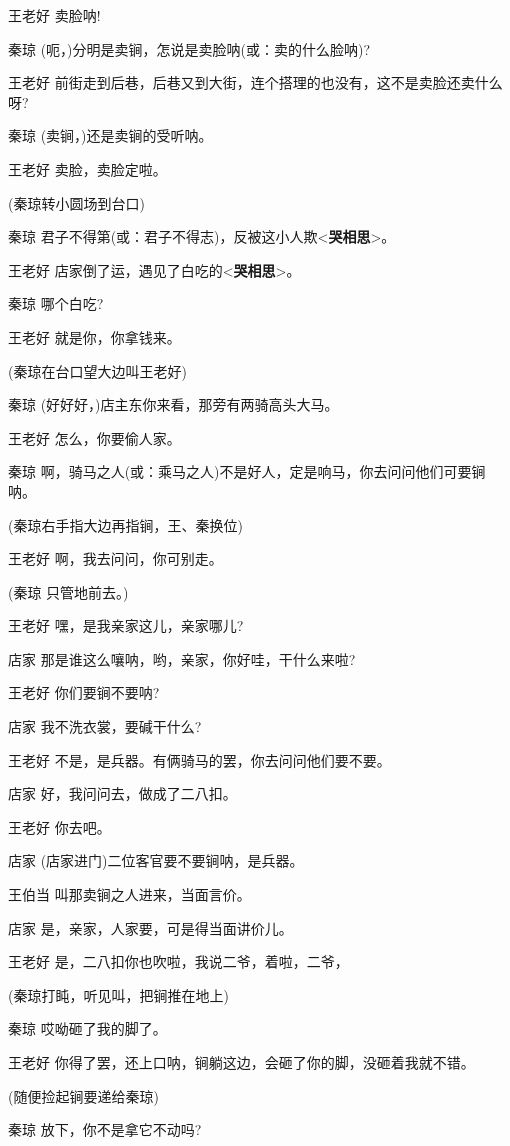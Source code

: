 王老好 卖脸呐!

秦琼 (呃，)分明是卖锏，怎说是卖脸呐(或：卖的什么脸呐)?

王老好
前街走到后巷，后巷又到大街，连个搭理的也没有，这不是卖脸还卖什么呀?

秦琼 (卖锏，)还是卖锏的受听呐。

王老好 卖脸，卖脸定啦。

(秦琼转小圆场到台口)

秦琼
君子不得第(或：君子不得志)，反被这小人欺\textless{}\textbf{哭相思}\textgreater{}。

王老好
店家倒了运，遇见了白吃的\textless{}\textbf{哭相思}\textgreater{}。

秦琼 哪个白吃?

王老好 就是你，你拿钱来。

(秦琼在台口望大边叫王老好)

秦琼 (好好好，)店主东你来看，那旁有两骑高头大马。

王老好 怎么，你要偷人家。

秦琼
啊，骑马之人(或：乘马之人)不是好人，定是响马，你去问问他们可要锏呐。

(秦琼右手指大边再指锏，王、秦换位)

王老好 啊，我去问问，你可别走。

(秦琼 只管地前去。)

王老好 嘿，是我亲家这儿，亲家哪儿?

店家 那是谁这么嚷呐，哟，亲家，你好哇，干什么来啦?

王老好 你们要锏不要呐?

店家 我不洗衣裳，要碱干什么?

王老好 不是，是兵器。有俩骑马的罢，你去问问他们要不要。

店家 好，我问问去，做成了二八扣。

王老好 你去吧。

店家 (店家进门)二位客官要不要锏呐，是兵器。

王伯当 叫那卖锏之人进来，当面言价。

店家 是，亲家，人家要，可是得当面讲价儿。

王老好 是，二八扣你也吹啦，我说二爷，着啦，二爷，

(秦琼打盹，听见叫，把锏推在地上)

秦琼 哎呦砸了我的脚了。

王老好 你得了罢，还上口呐，锏躺这边，会砸了你的脚，没砸着我就不错。

(随便捡起锏要递给秦琼)

秦琼 放下，你不是拿它不动吗?

